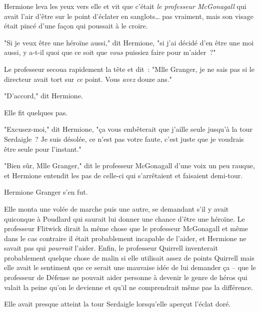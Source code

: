 Hermione leva les yeux vers elle et vit que c'était \emph{le professeur McGonagall} qui avait l'air d'être sur le point d'éclater en sanglots… pas vraiment, mais son visage était pincé d'une façon qui poussait à le croire.

"Si je veux être une héroïne aussi," dit Hermione, "si j'ai décidé d'en être une moi aussi, y a-t-il quoi que ce soit que \emph{vous} puissiez faire pour m'aider~?"

Le professeur secoua rapidement la tête et dit~: "Mlle Granger, je ne sais pas si le directeur avait tort sur \emph{ce} point. Vous \emph{avez} douze ans."

"D'accord," dit Hermione.

Elle fit quelques pas.

"Excusez-moi," dit Hermione, "ça vous embêterait que j'aille seule jusqu'à la tour Serdaigle~? Je suis désolée, ce n'est pas votre faute, c'est juste que je voudrais être seule pour l'instant."

"Bien sûr, Mlle Granger," dit le professeur McGonagall d'une voix un peu rauque, et Hermione entendit les pas de celle-ci qui s'arrêtaient et faisaient demi-tour.

Hermione Granger s'en fut.

Elle monta une volée de marche puis une autre, se demandant s'il y avait quiconque à Poudlard qui saurait lui donner une chance d'être une héroïne. Le professeur Flitwick dirait la même chose que le professeur McGonagall et même dans le cas contraire il était probablement incapable de l'aider, et Hermione ne savait pas qui \emph{pourrait} l'aider. Enfin, le professeur Quirrell inventerait probablement quelque chose de malin si elle utilisait assez de points Quirrell mais elle avait le sentiment que ce serait une mauvaise idée de lui demander ça -- que le professeur de Défense ne pouvait aider personne à devenir le genre de héros qui valait la peine qu'on le devienne et qu'il ne comprendrait même pas la différence.

Elle avait presque atteint la tour Serdaigle lorsqu'elle aperçut l'éclat doré. 

